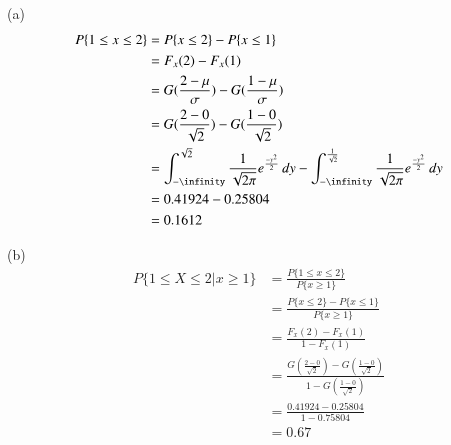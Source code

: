 \documentclass{beamer}
\begin{document}
  \begin{frame}{(a)}
  \begin{align}
 P \{1 \le x \le 2\} &= P\{x \le 2\} - P\{x \le 1\} \\
            &=   F_x(2) - F_x(1) \\
                    &=
               G(\frac{2-\mu}{\sigma}) - G(\frac{1-\mu}{\sigma}) \\
                        &=
               G(\frac{2-0}{\sqrt{2}}) - G(\frac{1-0}{\sqrt{2}})  \\
                    &=
            \int_{-\infinity}^{\sqrt{2}}\frac{1}{\sqrt{2\pi}} e^\frac{-y^2}{2} \, dy -                 \int_{-\infinity}^{\frac{1}{\sqrt{2}}}\frac{1}{\sqrt{2\pi}} e^\frac{-y^2}{2} \, dy \\
                  &=
                0.41924 - 0.25804 \\
                &=
                0.1612 \\
                \end{align}
 
  \end{frame}
  
 

\begin{frame}{(b)}
\begin{align}
     P \{1\le X \le 2 | x\ge1 \} &= \frac{P\{1\le x \le 2\}}{P\{x\ge 1\}} \\
                                &=
                    \frac{P\{x \le 2\} - P\{x \le 1\}}{P\{x \ge 1\}} \\
                    &=
                    \frac{F_x(2) - F_x(1)}{1-F_x(1)} \\
                    &=
                    \frac{G(\frac{2-0}{\sqrt{2}}) - G(\frac{1-0}{\sqrt{2}}) }{1-G(\frac{1-0}{\sqrt{2}})} \\
                    &=
                    \frac{0.41924-0.25804}{1-0.75804}\\
                    &=
                    0.67
        \end{align}

\end{frame}
\end{document}
